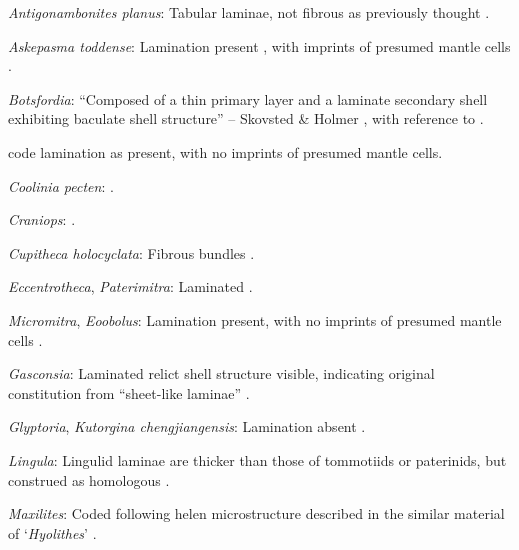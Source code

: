 \documentclass[openany]{book}
\begin{document}
\hypertarget{Antigonambonites_planus-coding-132}{}
\emph{Antigonambonites planus}: Tabular laminae, not fibrous as
previously thought \citep{Madison2017Laminarshell}.

\hypertarget{Askepasma_toddense-coding-132}{}
\emph{Askepasma toddense}: Lamination present
\citep{Balthasar2009Homologousskeletal}, with imprints of presumed
mantle cells \citep[following][appendix 2]{Williams1998Thediversity}.

\hypertarget{Botsfordia-coding-132}{}
\emph{Botsfordia}: ``Composed of a thin primary layer and a laminate
secondary shell exhibiting baculate shell structure'' -- Skovsted \&
Holmer \citeyearpar{Skovsted2005EarlyCambrian}, with reference to
\citet{Skovsted2003EarlyCambrian}.

\citet[appendix 2]{Williams1998Thediversity} code lamination as present,
with no imprints of presumed mantle cells.

\hypertarget{Coolinia_pecten-coding-132}{}
\emph{Coolinia pecten}: \citet{Dewing2004}.

\hypertarget{Craniops-coding-132}{}
\emph{Craniops}: \citep[fig. 249.1]{Williams1997Introduction}.

\hypertarget{Cupitheca_holocyclata-coding-132}{}
\emph{Cupitheca holocyclata}: Fibrous bundles \citep{Vendrasco2017}.

\hypertarget{Eccentrotheca-coding-132}{}
\emph{Eccentrotheca}, \emph{Paterimitra}: Laminated
\citep{Balthasar2009Homologousskeletal}.

\hypertarget{Eoobolus-coding-132}{}
\emph{Micromitra}, \emph{Eoobolus}: Lamination present, with no imprints
of presumed mantle cells \citep[following][appendix
2]{Williams1998Thediversity}.

\hypertarget{Gasconsia-coding-132}{}
\emph{Gasconsia}: Laminated relict shell structure visible, indicating
original constitution from ``sheet-like laminae''
\citep{Hanken1985Thetaxonomy}.

\hypertarget{Glyptoria-coding-132}{}
\emph{Glyptoria}, \emph{Kutorgina chengjiangensis}: Lamination absent
\citep[following][appendix 2]{Williams1998Thediversity}.

\hypertarget{Lingula-coding-132}{}
\emph{Lingula}: Lingulid laminae are thicker than those of tommotiids or
paterinids, but construed as homologous
\citep{Balthasar2009Homologousskeletal}.

\hypertarget{Maxilites-coding-132}{}
\emph{Maxilites}: Coded following helen microstructure described in the
similar material of `\emph{Hyolithes}' \citep{MartiMus2007}.
\end{document}
